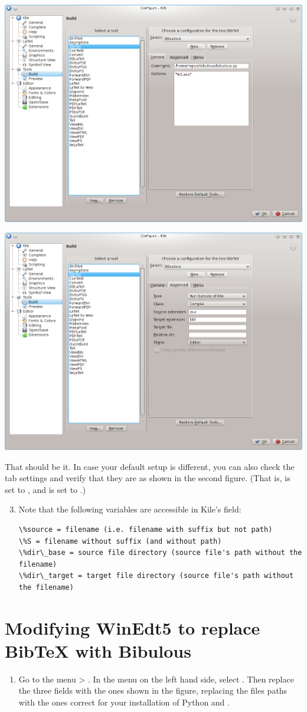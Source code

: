 \documentclass[letterpaper,10pt,english]{sphinxmanual}
\begin{document}
\includegraphics[width=0.490\linewidth]{screenshot_for_kile_instructions.png}

\includegraphics[width=0.490\linewidth]{screenshot_for_kile_instructions2.png}

That should be it. In case your default setup is different, you can also check the  tab settings and verify that they are as shown in the second figure. (That is,  is set to , and  is set to .)
\begin{enumerate}
\setcounter{enumi}{2}
\item {} 
Note that the following variables are accessible in Kile's  field:

\begin{Verbatim}[commandchars=\\\{\}]
\%source = filename (i.e. filename with suffix but not path)
\%S = filename without suffix (and without path)
\%dir\_base = source file directory (source file's path without the filename)
\%dir\_target = target file directory (source file's path without the filename)
\end{Verbatim}

\end{enumerate}


\section{Modifying WinEdt5 to replace BibTeX with Bibulous}
\label{getting_started:modifying-winedt5-to-replace-bibtex-with-bibulous}\begin{enumerate}
\item {} 
Go to the menu  \textgreater{} . In the  menu on the left hand side, select . Then replace the three  fields with the ones shown in the figure, replacing the files paths with the ones correct for your installation of Python and .

\end{enumerate}
\end{document}
